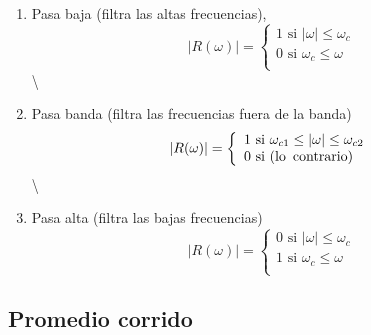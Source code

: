 \documentclass[
]{agujournal2019}
\providecommand{\tightlist}{%
  \setlength{\itemsep}{0pt}\setlength{\parskip}{0pt}}\usepackage{longtable,booktabs,array}
\begin{document}
\begin{enumerate}
\def\labelenumi{(\arabic{enumi})}
\tightlist
\item
  Pasa baja (filtra las altas frecuencias), \begin{equation*}
  |R(\omega)|=
    \left
    \lbrace
    \begin{array}{l}
   1 \text{ si } |\omega| \le \omega_c \\
   0 \text{ si } \omega_c \le \omega   \\
    \end{array}
    \right.
    \end{equation*} \textbackslash{}
\item
  Pasa banda (filtra las frecuencias fuera de la banda)
  \begin{equation*}
  |R(\omega)|=\left\lbrace
    \begin{array}{l}
   1 \text{ si } \omega_{c1}\le|\omega|\le \omega_{c2} \\
   0 \text{ si } \text({\rm lo}\,\,\,{\rm contrario}) \\
    \end{array}
    \right.
    \end{equation*} \textbackslash{}
\item
  Pasa alta (filtra las bajas frecuencias) \begin{equation*}
  |R(\omega)|=\left\lbrace
    \begin{array}{l}
   0 \text{ si } |\omega|\le \omega_c \\
   1 \text{ si } \omega_c\le\omega \\
    \end{array}
    \right.
    \end{equation*}
\end{enumerate}

\begin{center}
\end{center}

\subsection{Promedio corrido}
\end{document}
